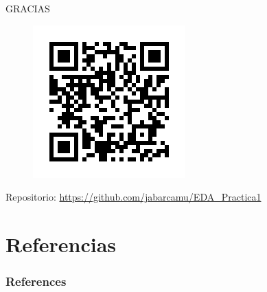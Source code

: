 \documentclass[11pt]{beamer}
\begin{document}
		\begin{frame}{}
		    \centering
		    
		    {
		        \Large
		        GRACIAS
		    }
		    
		    \begin{figure}[H]
				\centering
				\includegraphics[scale=0.5]{img/qr_repositorio.png}
				
				\label{fig:qr_repositorio}
			\end{figure}
			
			Repositorio: \url{https://github.com/jabarcamu/EDA_Practica1}
		    
		\end{frame}

\section{Referencias}



\begin{frame}[t, allowframebreaks]
    \frametitle{References}
    
    
\end{frame}
\end{document}
